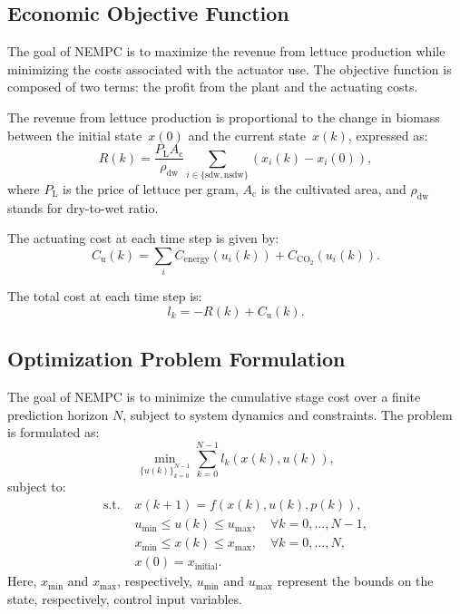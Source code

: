 \documentclass[conference]{IEEEtran}
\newcommand{\ui}[2]{#1_{\mathrm{#2}}}
\newcommand{\coo}{\ensuremath{\mathrm{CO_2}}}
\begin{document}
\subsection{Economic Objective Function}\label{subsec:mpc_objective}
The goal of NEMPC is to maximize the revenue from lettuce production while minimizing the costs associated with the actuator use. The objective function is composed of two terms: the profit from the plant and the actuating costs.

The revenue from lettuce production is proportional to the change in biomass between the initial state~\(x(0)\) and the current state~\(x(k)\), expressed as:
\begin{equation}
    R(k) = \frac{\ui{P}{L} \ui{A}{c}}{\ui{\rho}{dw}} \textstyle\sum_{i\in \{ \mathrm{sdw}, \mathrm{nsdw} \}}(x_i(k) - x_i(0)),
\end{equation}
where \(\ui{P}{L}\) is the price of lettuce per gram, \(\ui{A}{c}\) is the cultivated area, and \(\ui{\rho}{dw}\) stands for dry-to-wet ratio.

The actuating cost at each time step is given by:
\begin{equation}
    \ui{C}{u}(k) = \textstyle\sum_{i} \ui{C}{energy}(u_i(k)) + \ui{C}{\coo}(u_i(k)).
\end{equation}

The total cost at each time step is:
\begin{equation}
    l_k = -R(k) + \ui{C}{u}(k).
\end{equation}

\subsection{Optimization Problem Formulation}
The goal of NEMPC is to minimize the cumulative stage cost over a finite prediction horizon \( N \), subject to system dynamics and constraints. The problem is formulated as:
\begin{equation}
    \min_{{\{u(k)\}}_{k=0}^{N-1}} \sum_{k=0}^{N-1} l_k(x(k), u(k)),
\end{equation}
subject to:
\begin{align}
    \text{s.t. } & x(k+1) = f(x(k), u(k), p(k)),                                      \\
                 & u_{\min} \leq u(k) \leq u_{\max}, \quad \forall k = 0, \dots, N-1, \\
                 & x_{\min} \leq x(k) \leq x_{\max}, \quad \forall k = 0, \dots, N,   \\
                 & x(0) = x_{\text{initial}}.
\end{align}
Here, \(x_{\min}\) and \(x_{\max}\), respectively, \(u_{\min}\) and \(u_{\max}\) represent the bounds on the state, respectively, control input variables.
\end{document}
